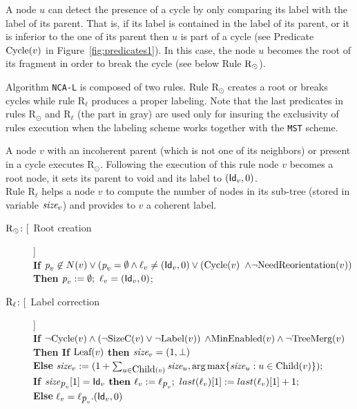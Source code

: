 \documentclass[11pt,a4paper]{article}
\newcommand{\id}{\mbox{\sf Id}}
\newcommand{\parent}{\mbox{\it p}}
\newcommand{\lab}{\mbox{\rm $\ell$}}
\newcommand{\TS}{\mbox{\it size}}
\newcommand{\Child}{\mbox{\rm Child}}
\newcommand{\SizeC}{\mbox{\rm SizeC}}
\newcommand{\Cycle}{\mbox{\rm Cycle}}
\newcommand{\Label}{\mbox{\rm Label}}
\newcommand{\Isleaf}{\mbox{\rm Leaf}}
\newcommand{\NeedReorientation}{\mbox{\rm NeedReorientation}}
\newcommand{\TreeChange}{\mbox{\rm TreeMerg}}
\newcommand{\IsMinEnabled}{\mbox{\rm MinEnabled}}
\newcommand{\RRoot}{\mbox{\rm R$_{\odot}$}} 	\newcommand{\RRLC}{\mbox{\rm R$_{\ell_{\odot}}$}}\newcommand{\RLC}{\mbox{\rm R$_{\ell}$}} \newcommand{\RMin}{\mbox{\rm R$_{Min}$}}
\newcommand{\MST}{\mbox{\tt MST}}
\newcommand{\LabA}{\mbox{\tt NCA-L}}
\begin{document}
A node $u$ can detect the presence of a cycle by only comparing its label with the label of its parent. That is, if its label 
is contained in the label of its parent, or it is inferior to the one of 
its parent then $u$ is part of a cycle (see Predicate $\Cycle(v)$ in Figure~\ref{fig:predicates1}). In this case, the node $u$ becomes the root of its fragment in order to break the cycle (see below Rule $\RRoot$). 


 Algorithm \LabA\/ is composed of two rules. Rule \RRoot\/ 
creates a root or breaks cycles while rule \RLC\/ produces a proper 
labeling. Note that the last predicates in rules \RRoot\/ and \RLC\/ 
(the part in gray) are used only for insuring the exclusivity of rules execution when the labeling scheme works together with the \MST\/ scheme.
 


A node $v$ with an incoherent parent (which is not one of its neighbors) 
or present in a cycle executes \RRoot\/. Following the execution of this rule 
node $v$ becomes a root node, it sets its parent to void and its label to $(\id_v,0)$.\\


Rule \RLC\/ helps a node $v$ to compute the number of nodes in 
its sub-tree (stored in variable $\TS_v$) and provides to $v$ a coherent label. 






\begin{description}
\item[$\RRoot$: [\ Root creation]] \\
\textbf{If} $\parent_v \not \in N(v) \vee (\parent_v=\emptyset \wedge \lab_v\neq(\id_v,0) \vee (\Cycle(v)$ \textcolor[gray]{0.5}{$\wedge \neg \NeedReorientation(v))$}\\
\textbf{Then} $\parent_v:=\emptyset;\ \lab_v=(\id_v,0)$;
\end{description}




\begin{description}
\item[$\RLC$: [\ Label correction]]\\
\textbf{If} $\neg \Cycle(v)  \wedge (\neg \SizeC(v) \vee \neg \Label(v))$ \textcolor[gray]{0.5}{$\wedge \IsMinEnabled(v) \wedge \neg \TreeChange(v)$}\\
\textbf{Then If} $\Isleaf(v)$ \textbf{then} $\TS_v=(1,\bot)$\\
\hspace*{1cm} \textbf{Else } $\TS_v:=(1+\sum_{u \in \Child(v)} \TS_u,\arg\max\{\TS_u: u\in \Child(v)\});$\\
\hspace*{1cm} \textbf{If} $\TS_{\parent_v}[1]=\id_v \mbox{\textbf{ then }} \lab_v:=\lab_{\parent_v};\ last(\lab_v)[1]:=last(\lab_v)[1]+1;$\\
\hspace*{1,1cm}\textbf{Else} $\lab_v=\lab_{\parent_v}.(\id_v,0)$
\end{description}
\end{document}

